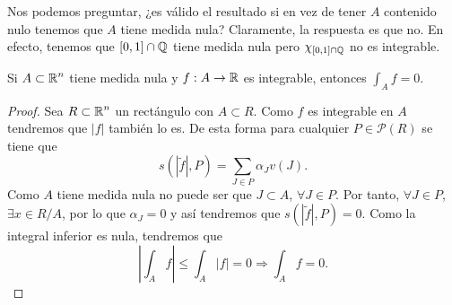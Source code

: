 \begin{observation}
	Nos podemos preguntar, ¿es válido el resultado si en vez de tener $\displaystyle A $ contenido nulo tenemos que $\displaystyle A $ tiene medida nula? Claramente, la respuesta es que no. En efecto, tenemos que $\displaystyle \left[0,1\right] \cap \mathbb{Q} $ tiene medida nula pero $\displaystyle \chi_{\left[0,1\right] \cap \mathbb{Q}} $ no es integrable.  
\end{observation}
\begin{prop}
Si $\displaystyle A \subset \mathbb{R}^{n} $ tiene medida nula y $\displaystyle f : A \to \mathbb{R} $ es integrable, entonces $\displaystyle \int _{A}f =0 $. 
\end{prop}
\begin{proof}
	Sea $\displaystyle R \subset \mathbb{R}^{n} $ un rectángulo con $\displaystyle A \subset R $. Como $\displaystyle f $ es integrable en $\displaystyle A $ tendremos que $\displaystyle \left|f\right| $ también lo es. De esta forma para cualquier $\displaystyle P \in \mathcal{P}\left(R\right) $ se tiene que 
	\[ s\left( \left|\tilde{f}\right|, P\right)=\sum_{J \in P}\alpha_{J}v\left(J\right)  .\]
	Como $\displaystyle A $ tiene medida nula no puede ser que $\displaystyle J \subset A $, $\displaystyle \forall J \in P $. Por tanto, $\displaystyle \forall J \in P $, $\displaystyle \exists x \in R/A $, por lo que $\displaystyle \alpha_{J}=0 $ y así tendremos que $\displaystyle s\left( \left|\tilde{f}\right|, P\right)= 0 $. Como la integral inferior es nula, tendremos que 
	\[ \left|\int _{A}f \right|\leq \int _{A} \left|f\right| = 0 \Rightarrow \int _{A}f =0.\]
\end{proof}

